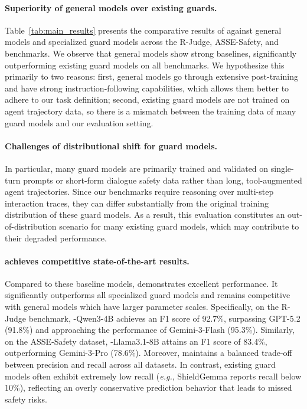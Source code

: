 \paragraph{Superiority of general models over existing guards.}
Table~\ref{tab:main_results} presents the comparative results of \toolAG{} against general models and specialized guard models across the R-Judge, ASSE-Safety, and \toolBench{} benchmarks. We observe that general models show strong baselines, significantly outperforming existing guard models on all benchmarks. We hypothesize this primarily to two reasons: first, general models go through extensive post-training and have strong instruction-following capabilities, which allows them better to adhere to our task definition; second, existing guard models are not trained on agent trajectory data, so there is a mismatch between the training data of many guard models and our evaluation setting.

\paragraph{Challenges of distributional shift for guard models.}
In particular, many guard models are primarily trained and validated on single-turn prompts or short-form dialogue safety data rather than long, tool-augmented agent trajectories. Since our benchmarks require reasoning over multi-step interaction traces, they can differ substantially from the original training distribution of these guard models. As a result, this evaluation constitutes an out-of-distribution scenario for many existing guard models, which may contribute to their degraded performance.

\paragraph{\toolAG{} achieves competitive state-of-the-art results.}
Compared to these baseline models, \toolAG{} demonstrates excellent performance. It significantly outperforms all specialized guard models and remains competitive with general models which have larger parameter scales. Specifically, on the R-Judge benchmark, \toolAG{}-Qwen3-4B achieves an F1 score of 92.7\%, surpassing GPT-5.2 (91.8\%) and approaching the performance of Gemini-3-Flash (95.3\%). Similarly, on the ASSE-Safety dataset, \toolAG{}-Llama3.1-8B attains an F1 score of 83.4\%, outperforming Gemini-3-Pro (78.6\%). Moreover, \toolAG{} maintains a balanced trade-off between precision and recall across all datasets. In contrast, existing guard models often exhibit extremely low recall (\emph{e.g.}, ShieldGemma reports recall below 10\%), reflecting an overly conservative prediction behavior that leads to missed safety risks.

